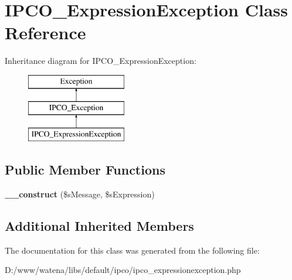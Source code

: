 \hypertarget{class_i_p_c_o___expression_exception}{\section{I\-P\-C\-O\-\_\-\-Expression\-Exception Class Reference}
\label{class_i_p_c_o___expression_exception}
}
Inheritance diagram for I\-P\-C\-O\-\_\-\-Expression\-Exception\-:\begin{figure}[H]
\begin{center}
\leavevmode
\includegraphics[height=3.000000cm]{class_i_p_c_o___expression_exception}
\end{center}
\end{figure}
\subsection*{Public Member Functions}
\begin{DoxyCompactItemize}
\item 
\hypertarget{class_i_p_c_o___expression_exception_ab20a2b4146cd6397507e09ddb5934fd0}{{\bfseries \-\_\-\-\_\-construct} (\$s\-Message, \$s\-Expression)}\label{class_i_p_c_o___expression_exception_ab20a2b4146cd6397507e09ddb5934fd0}

\end{DoxyCompactItemize}
\subsection*{Additional Inherited Members}


The documentation for this class was generated from the following file\-:\begin{DoxyCompactItemize}
\item 
D\-:/www/watena/libs/default/ipco/ipco\-\_\-expressionexception.\-php\end{DoxyCompactItemize}
